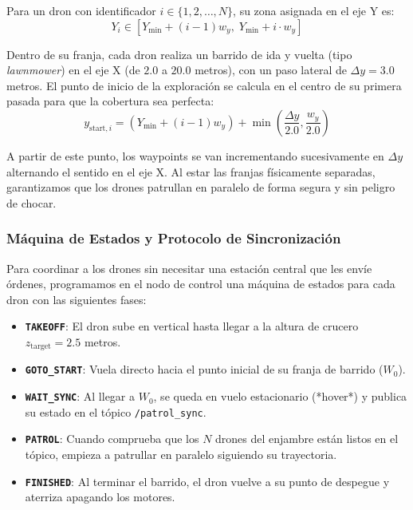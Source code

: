 \documentclass[11pt,a4paper]{article}
\begin{document}
Para un dron con identificador $i \in \{1, 2, \dots, N\}$, su zona asignada en el eje Y es:
\begin{equation}
Y_i \in [Y_{\text{min}} + (i - 1)w_y, \; Y_{\text{min}} + i \cdot w_y]
\end{equation}

Dentro de su franja, cada dron realiza un barrido de ida y vuelta (tipo \textit{lawnmower}) en el eje X (de $2.0$ a $20.0$ metros), con un paso lateral de $\Delta y = 3.0$ metros. El punto de inicio de la exploración se calcula en el centro de su primera pasada para que la cobertura sea perfecta:
\begin{equation}
y_{\text{start}, i} = (Y_{\text{min}} + (i - 1)w_y) + \min\left(\frac{\Delta y}{2.0}, \frac{w_y}{2.0}\right)
\end{equation}

A partir de este punto, los waypoints se van incrementando sucesivamente en $\Delta y$ alternando el sentido en el eje X. Al estar las franjas físicamente separadas, garantizamos que los drones patrullan en paralelo de forma segura y sin peligro de chocar.

\subsubsection{Máquina de Estados y Protocolo de Sincronización}
Para coordinar a los drones sin necesitar una estación central que les envíe órdenes, programamos en el nodo de control una máquina de estados para cada dron con las siguientes fases:
\begin{itemize}
    \item \textbf{\texttt{TAKEOFF}}: El dron sube en vertical hasta llegar a la altura de crucero $z_{\text{target}} = 2.5$ metros.
    \item \textbf{\texttt{GOTO\_START}}: Vuela directo hacia el punto inicial de su franja de barrido ($W_0$).
    \item \textbf{\texttt{WAIT\_SYNC}}: Al llegar a $W_0$, se queda en vuelo estacionario (*hover*) y publica su estado en el tópico \texttt{/patrol\_sync}.
    \item \textbf{\texttt{PATROL}}: Cuando comprueba que los $N$ drones del enjambre están listos en el tópico, empieza a patrullar en paralelo siguiendo su trayectoria.
    \item \textbf{\texttt{FINISHED}}: Al terminar el barrido, el dron vuelve a su punto de despegue y aterriza apagando los motores.
\end{itemize}
\end{document}
